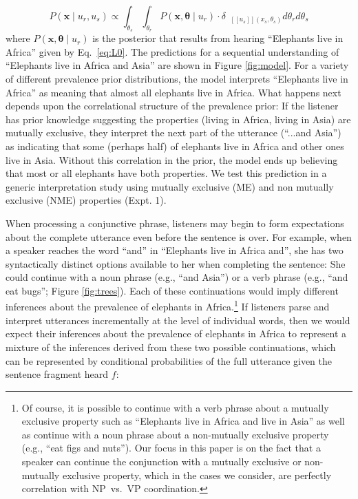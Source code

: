 \documentclass[10pt,letterpaper]{article}
\newcommand{\denote}[1]{\mbox{ $[\![ #1 ]\!]$}}
\begin{document}
\begin{equation}
P(\textbf{x} \mid u_{r}, u_{s}) \propto  \int_{\theta_s} \int_{\theta_r}P(\textbf{x}, \boldsymbol{\theta} \mid u_{r})  \cdot \delta_{\denote{u_{s}}(x_{s}, \theta_{s})} d\theta_r d\theta_s%
\label{eq:L0a}
\end{equation}
\noindent where $P(\textbf{x}, \boldsymbol{\theta} \mid u_{r})$  is the posterior that results from hearing ``Elephants live in Africa'' given by Eq.~\ref{eq:L0}.
The predictions for a sequential understanding of ``Elephants live in Africa and Asia'' are shown in Figure \ref{fig:model}.
For a variety of different prevalence prior distributions, the model interprets ``Elephants live in Africa'' as meaning that almost all elephants live in Africa.
What happens next depends upon the correlational structure of the prevalence prior: If the listener has prior knowledge suggesting the properties (living in Africa, living in Asia) are mutually exclusive, they interpret the next part of the utterance (``...and Asia'') as indicating that some (perhaps half) of elephants live in Africa and other ones live in Asia. 
Without this correlation in the prior, the model ends up believing that most or all elephants have both properties. 
We test this prediction in a generic interpretation study using mutually exclusive (ME) and non mutually exclusive (NME) properties (Expt. 1). 

When processing a conjunctive phrase, listeners may begin to form expectations about the complete utterance even before the sentence is over. 
For example, when a speaker reaches the word ``and'' in ``Elephants live in Africa and'', she has two syntactically distinct options available to her when completing the sentence: She could continue with a noun phrase (e.g., ``and Asia'') or a verb phrase (e.g., ``and eat bugs''; Figure \ref{fig:trees}).
Each of these continuations would imply different inferences about the prevalence of elephants in Africa.\footnote{
	Of course, it is possible to continue with a verb phrase about a mutually exclusive property such as ``Elephants live in Africa and live in Asia'' as well as continue with a noun phrase about a non-mutually exclusive property (e.g., ``eat figs and nuts''). Our focus in this paper is on the fact that a speaker can continue the conjunction with a mutually exclusive or non-mutually exclusive property, which in the cases we consider, are perfectly correlation with NP~vs.~VP coordination.
}
If listeners parse and interpret utterances incrementally at the level of individual words, then we would expect their inferences about the prevalence of elephants in Africa to represent a mixture of the inferences derived from these two possible continuations, which can be represented by conditional probabilities of the full utterance given the sentence fragment heard $f$:
\end{document}
